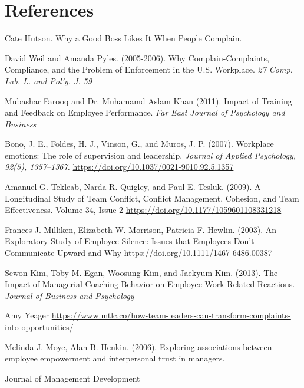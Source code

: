 \documentclass[a4paper,12pt]{report}
\begin{document}
\section{References}
\vspace*{-35pt}
\begin{thebibliography}{99}

Cate Hutson. Why a Good Boss Likes It When People Complain.

David Weil and Amanda Pyles. (2005-2006). Why Complain-Complaints, Compliance, and the Problem of Enforcement in the U.S. Workplace. \textit{27 Comp. Lab. L. and Pol'y. J. 59 }

Mubashar Farooq and Dr. Muhamamd Aslam Khan (2011). Impact of Training and Feedback on Employee Performance. \textit{Far East Journal of Psychology and Business }

Bono, J. E., Foldes, H. J., Vinson, G., and Muros, J. P. (2007). Workplace emotions: The role of supervision and leadership. \textit{Journal of Applied Psychology, 92(5), 1357–1367.} \url{https://doi.org/10.1037/0021-9010.92.5.1357}

Amanuel G. Tekleab, Narda R. Quigley, and Paul E. Tesluk. (2009). A Longitudinal Study of Team Conflict, Conflict Management, Cohesion, and Team Effectiveness. Volume 34, Issue 2 \url{https://doi.org/10.1177/1059601108331218}

Frances J. Milliken, Elizabeth W. Morrison, Patricia F. Hewlin. (2003). An Exploratory Study of Employee Silence: Issues that Employees Don’t Communicate Upward and Why \url{https://doi.org/10.1111/1467-6486.00387}

Sewon Kim, Toby M. Egan, Woosung Kim, and Jaekyum Kim. (2013). The Impact of Managerial Coaching Behavior on Employee Work-Related Reactions. \textit{Journal of Business and Psychology}

Amy Yeager \url{https://www.mtlc.co/how-team-leaders-can-transform-complaints-into-opportunities/}

Melinda J. Moye, Alan B. Henkin. (2006). Exploring associations between employee empowerment and interpersonal trust in managers. 

\end{thebibliography}

Journal of Management Development
\end{document}
